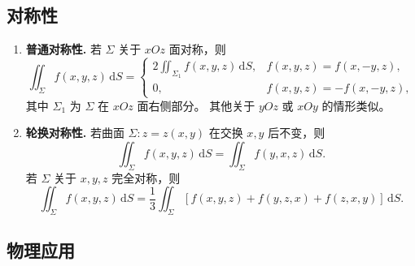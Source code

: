 \subsection{对称性}

\begin{enumerate}
      \item \textbf{普通对称性.}
            若 $\Sigma$ 关于 $xOz$ 面对称，则
            \[
                  \iint_{\Sigma} f(x,y,z)\, \mathrm{d}S =
                  \begin{cases}
                        2 \iint_{\Sigma_1} f(x,y,z)\, \mathrm{d}S, & f(x,y,z) = f(x,-y,z),  \\[4pt]
                        0,                                         & f(x,y,z) = -f(x,-y,z),
                  \end{cases}
            \]
            其中 $\Sigma_1$ 为 $\Sigma$ 在 $xOz$ 面右侧部分。
            其他关于 $yOz$ 或 $xOy$ 的情形类似。

      \item \textbf{轮换对称性.}
            若曲面 $\Sigma: z=z(x,y)$ 在交换 $x,y$ 后不变，则
            \[
                  \iint_{\Sigma} f(x,y,z)\, \mathrm{d}S
                  = \iint_{\Sigma} f(y,x,z)\, \mathrm{d}S.
            \]
            若 $\Sigma$ 关于 $x,y,z$ 完全对称，则
            \[
                  \iint_{\Sigma} f(x,y,z)\, \mathrm{d}S
                  = \frac{1}{3} \iint_{\Sigma} [f(x,y,z) + f(y,z,x) + f(z,x,y)]\, \mathrm{d}S.
            \]
\end{enumerate}


\subsection{物理应用}

